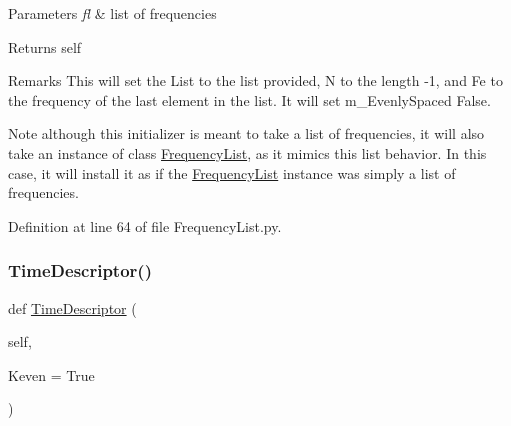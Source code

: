 \begin{DoxyParams}{Parameters}
{\em fl} & list of frequencies \\
\hline
\end{DoxyParams}
\begin{DoxyReturn}{Returns}
self 
\end{DoxyReturn}
\begin{DoxyRemark}{Remarks}
This will set the List to the list provided, N to the length -\/1, and Fe to the frequency of the last element in the list. It will set m\+\_\+\+Evenly\+Spaced False. 
\end{DoxyRemark}
\begin{DoxyNote}{Note}
although this initializer is meant to take a list of frequencies, it will also take an instance of class \hyperlink{classSignalIntegrity_1_1FrequencyDomain_1_1FrequencyList_1_1FrequencyList}{Frequency\+List}, as it mimics this list behavior. In this case, it will install it as if the \hyperlink{classSignalIntegrity_1_1FrequencyDomain_1_1FrequencyList_1_1FrequencyList}{Frequency\+List} instance was simply a list of frequencies. 
\end{DoxyNote}


Definition at line 64 of file Frequency\+List.\+py.

\mbox{\label{classSignalIntegrity_1_1FrequencyDomain_1_1FrequencyList_1_1FrequencyList_ae0cb8207edfbc631f1af2fc543e3d4d7}} 
\subsubsection{\texorpdfstring{Time\+Descriptor()}{TimeDescriptor()}}
{\footnotesize\ttfamily def \hyperlink{classSignalIntegrity_1_1TimeDomain_1_1Waveform_1_1TimeDescriptor_1_1TimeDescriptor}{Time\+Descriptor} (\begin{DoxyParamCaption}\item[{}]{self,  }\item[{}]{Keven = {\ttfamily True} }\end{DoxyParamCaption})}



